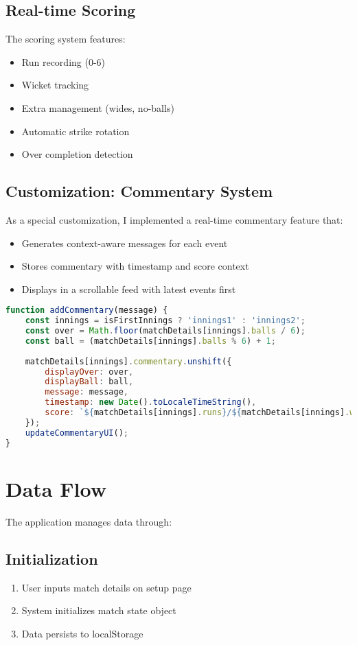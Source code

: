 \documentclass[12pt]{article}
\begin{document}
\subsection*{Real-time Scoring}
The scoring system features:
\begin{itemize}
    \item Run recording (0-6)
    \item Wicket tracking
    \item Extra management (wides, no-balls)
    \item Automatic strike rotation
    \item Over completion detection
\end{itemize}

\subsection*{Customization: Commentary System}
As a special customization, I implemented a real-time commentary feature that:
\begin{itemize}
    \item Generates context-aware messages for each event
    \item Stores commentary with timestamp and score context
    \item Displays in a scrollable feed with latest events first
\end{itemize}

\begin{lstlisting}[language=JavaScript]
function addCommentary(message) {
    const innings = isFirstInnings ? 'innings1' : 'innings2';
    const over = Math.floor(matchDetails[innings].balls / 6);
    const ball = (matchDetails[innings].balls % 6) + 1;
    
    matchDetails[innings].commentary.unshift({
        displayOver: over,
        displayBall: ball,
        message: message,
        timestamp: new Date().toLocaleTimeString(),
        score: `${matchDetails[innings].runs}/${matchDetails[innings].wickets}`
    });
    updateCommentaryUI();
}
\end{lstlisting}

\section*{Data Flow}
The application manages data through:

\subsection*{Initialization}
\begin{enumerate}
    \item User inputs match details on setup page
    \item System initializes match state object
    \item Data persists to localStorage
\end{enumerate}
\end{document}
